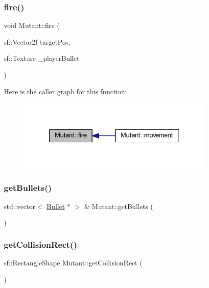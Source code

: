 \subsubsection{\texorpdfstring{fire()}{fire()}}
{\footnotesize\ttfamily void Mutant\+::fire (\begin{DoxyParamCaption}\item[{sf\+::\+Vector2f}]{target\+Pos,  }\item[{sf\+::\+Texture}]{\+\_\+player\+Bullet }\end{DoxyParamCaption})}

Here is the caller graph for this function\+:
\nopagebreak
\begin{figure}[H]
\begin{center}
\leavevmode
\includegraphics[width=278pt]{class_mutant_aaa71f2f6d0fe2be008db453bb9673d4c_icgraph}
\end{center}
\end{figure}
\mbox{\label{class_mutant_a0f42cf94b9b6fb45b292ce1fb4e3233f}} 
\subsubsection{\texorpdfstring{get\+Bullets()}{getBullets()}}
{\footnotesize\ttfamily std\+::vector$<$ \hyperlink{class_bullet}{Bullet} $\ast$ $>$ \& Mutant\+::get\+Bullets (\begin{DoxyParamCaption}{ }\end{DoxyParamCaption})}

\mbox{\label{class_mutant_ada703f83af37442914832a08333dab26}} 
\subsubsection{\texorpdfstring{get\+Collision\+Rect()}{getCollisionRect()}}
{\footnotesize\ttfamily sf\+::\+Rectangle\+Shape Mutant\+::get\+Collision\+Rect (\begin{DoxyParamCaption}{ }\end{DoxyParamCaption})}

